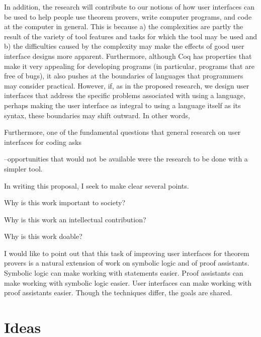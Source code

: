 \documentclass[11pt]{amsart}
\begin{document}
In addition, the research will contribute to our notions of how user interfaces can be used to help people use theorem provers, write computer programs, and code at the computer in general.  
This is because a) the complexities are partly the result of the variety of tool features and tasks for which the tool may be used and b) the difficulties caused by the complexity may make the effects of good user interface designs more apparent.  Furthermore, although Coq has properties that make it very appealing for developing programs (in particular, programs that are free of bugs), it also pushes at the boundaries of languages that programmers may consider practical.  However, if, as in the proposed research, we design user interfaces that address the specific problems associated with using a language, perhaps making the user interface as integral to using a language itself as its syntax, these boundaries may shift outward.  In other words, 

 Furthermore, one of the fundamental questions that general research on user interfaces for coding asks


--opportunities that would not be available were the research to be done with a simpler tool.

In writing this proposal, I seek to make clear several points.


Why is this work important to society?

Why is this work an intellectual contribution?

Why is this work doable?

I would like to point out that this task of improving user interfaces for theorem provers is a natural extension of work on symbolic logic and of proof assistants.  Symbolic logic can make working with statements easier.  Proof assistants can make working with symbolic logic easier.  User interfaces can make working with proof assistants easier.  Though the techniques differ, the goals are shared.

\section{Ideas}

\end{document}

